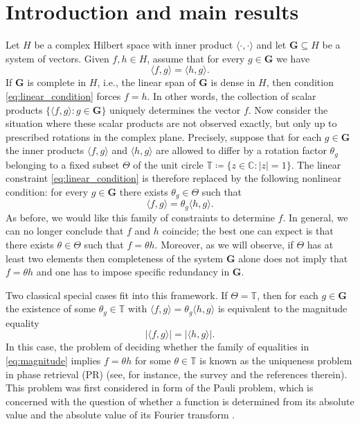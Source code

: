 \documentclass[reqno,a4paper,11pt]{amsart}
\numberwithin{equation}{section}
\def\T{{\mathbb T}}
\def\C{{\mathbb C}}
\newcommand\1{\mathds{1}}
\begin{document}
\maketitle

\section{Introduction and main results}

Let $H$ be a complex Hilbert space with inner product $\langle \cdot, \cdot \rangle$ and let $\mathbf{G} \subseteq H$ be a system of vectors. Given $f,h \in H$, assume that for every $g \in \mathbf{G}$ we have
\begin{equation}\label{eq:linear_condition}
\langle f,g \rangle = \langle h,g \rangle.
\end{equation}
If $\mathbf{G}$ is complete in $H$, i.e., the linear span of $\mathbf{G}$ is dense in $H$, then condition \eqref{eq:linear_condition} forces $f=h$. In other words, the collection of scalar products $\{\langle f,g \rangle : g \in \mathbf{G} \}$ uniquely determines the vector $f$. Now consider the situation where these scalar products are not observed exactly, but only up to prescribed rotations in the complex plane. Precisely, suppose that for each $g \in \mathbf{G}$ the inner products $\langle f,g\rangle$ and $\langle h,g\rangle$ are allowed to differ by a rotation factor $\theta_g$ belonging to a fixed subset $\Theta$ of the unit circle $\T \coloneqq \{ z \in \C : |z| = 1 \}$. The linear constraint \eqref{eq:linear_condition} is therefore replaced by the following nonlinear condition: for every $g \in \mathbf{G}$ there exists $\theta_g \in \Theta$ such that
$$
\langle f,g \rangle = \theta_g \langle h,g \rangle.
$$
As before, we would like this family of constraints to determine $f$. In general, we can no longer conclude that $f$ and $h$ coincide; the best one can expect is that there exists $\theta \in \Theta$ such that $f = \theta h$. Moreover, as we will observe, if $\Theta$ has at least two elements then completeness of the system $\mathbf{G}$ alone does not imply that $f= \theta h$ and one has to impose specific redundancy in $\mathbf{G}$.

Two classical special cases fit into this framework. If $\Theta = \T$, then for each $g \in \mathbf{G}$ the existence of some $\theta_g \in \T$ with $\langle f,g \rangle = \theta_g \langle h,g \rangle$ is equivalent to the magnitude equality
\begin{equation}\label{eq:magnitude}
    |\langle f,g \rangle| = | \langle h,g \rangle|.
\end{equation}
In this case, the problem of deciding whether the family of equalities in \eqref{eq:magnitude} implies $f = \theta h$ for some $\theta \in \T$ is known as the uniqueness problem in phase retrieval (PR) (see, for instance, the survey \cite{grohskopp2020phase} and the references therein). This problem was first considered in form of the Pauli problem, which is concerned with the question of whether a function is determined from its absolute value and the absolute value of its Fourier transform \cite{pauli1990allgemeinen,ramos}.
\end{document}

